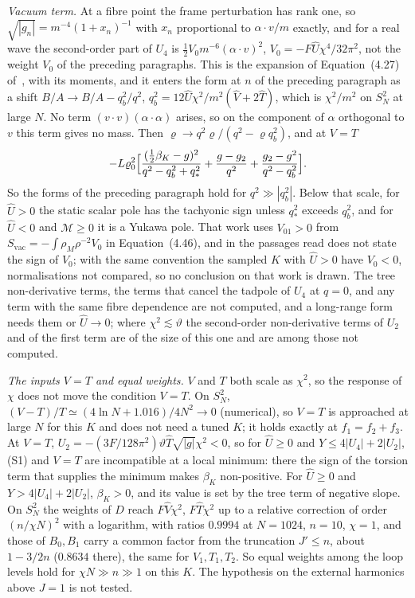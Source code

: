 \emph{Vacuum term.} At a fibre point the frame perturbation has rank one, so \(\sqrt{|g_n|}=m^{-4}(1+x_n)^{-1}\) with \(x_n\) proportional to \(\alpha\cdot v/m\) exactly, and for a real wave the second-order part of \(U_4\) is \(\tfrac12V_0m^{-6}(\alpha\cdot v)^2\), \(V_0=-F\hat U\chi^4/32\pi^2\), not the weight \(V_0\) of the preceding paragraphs. This is the expansion of Equation~(4.27) of~\cite{Steinacker2026}, with its moments, and it enters the form at \(n\) of the preceding paragraph as a shift \(B/A\to B/A-q_b^2/q^2\), \(q_b^2=12\hat U\chi^2/m^2(\hat V+2\hat T)\), which is \(\chi^2/m^2\) on \(S^2_N\) at large \(N\). No term \((v\cdot v)(\alpha\cdot\alpha)\) arises, so on the component of \(\alpha\) orthogonal to \(v\) this term gives no mass. Then \(\varrho\to q^2\varrho/(q^2-\varrho q_b^2)\), and at \(V=T\)
\[
-L\varrho_0^2\Bigl[\frac{(\tfrac12\beta_K-g)^2}{q^2-q_b^2+q_*^2}+\frac{g-g_2}{q^2}+\frac{g_2-g^2}{q^2-q_b^2}\Bigr].
\]
So the forms of the preceding paragraph hold for \(q^2\gg|q_b^2|\). Below that scale, for \(\hat U>0\) the static scalar pole has the tachyonic sign unless \(q_*^2\) exceeds \(q_b^2\), and for \(\hat U<0\) and \(\mathcal M\ge0\) it is a Yukawa pole. That work uses \(V_{01}>0\) from \(S_{\mathrm{vac}}=-\int\rho_M\rho^{-2}V_0\) in Equation~(4.46), and in the passages read does not state the sign of \(V_0\); with the same convention the sampled \(K\) with \(\hat U>0\) have \(V_0<0\), normalisations not compared, so no conclusion on that work is drawn. The tree non-derivative terms, the terms that cancel the tadpole of \(U_4\) at \(q=0\), and any term with the same fibre dependence are not computed, and a long-range form needs them or \(\hat U\to0\); where \(\chi^2\lesssim\vartheta\) the second-order non-derivative terms of \(U_2\) and of the first term are of the size of this one and are among those not computed.

\emph{The inputs \(V=T\) and equal weights.} \(V\) and \(T\) both scale as \(\chi^2\), so the response of \(\chi\) does not move the condition \(V=T\). On \(S^2_N\), \((V-T)/T\simeq(4\ln N+1.016)/4N^2\to0\) (numerical), so \(V=T\) is approached at large \(N\) for this \(K\) and does not need a tuned \(K\); it holds exactly at \(f_1=f_2+f_3\). At \(V=T\), \(U_2=-(3F/128\pi^2)\vartheta\hat T\sqrt{|g|}\chi^2<0\), so for \(\hat U\ge0\) and \(Y\le4|U_4|+2|U_2|\), (S1) and \(V=T\) are incompatible at a local minimum: there the sign of the torsion term that supplies the minimum makes \(\beta_K\) non-positive. For \(\hat U\ge0\) and \(Y>4|U_4|+2|U_2|\), \(\beta_K>0\), and its value is set by the tree term of negative slope. On \(S^2_N\) the weights of \(D\) reach \(F\hat V\chi^2\), \(F\hat T\chi^2\) up to a relative correction of order \((n/\chi N)^2\) with a logarithm, with ratios \(0.9994\) at \(N=1024\), \(n=10\), \(\chi=1\), and those of \(B_0,B_1\) carry a common factor from the truncation \(J'\le n\), about \(1-3/2n\) (\(0.8634\) there), the same for \(V_1,T_1,T_2\). So equal weights among the loop levels hold for \(\chi N\gg n\gg1\) on this \(K\). The hypothesis on the external harmonics above \(J=1\) is not tested.

